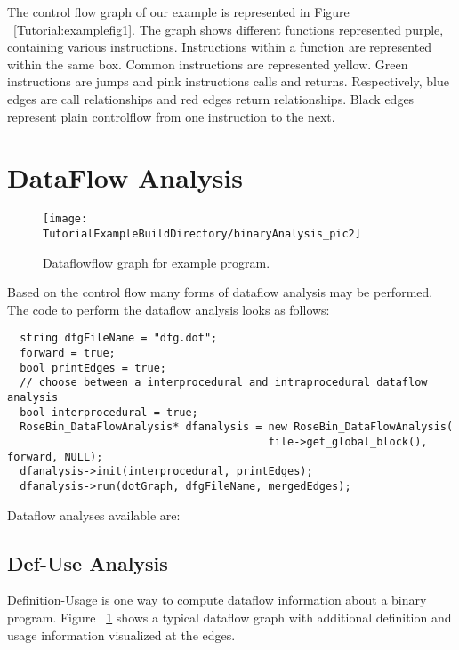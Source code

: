The control flow graph of our example is represented in Figure ~\ref{Tutorial:examplefig1}.
The graph shows different functions represented purple, containing various instructions.
Instructions within a function are represented within the same box. Common instructions are
represented yellow. Green instructions are jumps and pink instructions calls and returns.  
Respectively, blue edges are call relationships and red edges return relationships.
Black edges represent plain controlflow from one instruction to the next.



\section{DataFlow Analysis}

\begin{figure}
\texttt{[image: \\TutorialExampleBuildDirectory/binaryAnalysis\_pic2]}
\caption{Dataflowflow graph for example program.}
\label{Tutorial:examplefig2}
\end{figure}

Based on the control flow many forms of dataflow analysis may be performed.
The code to perform the dataflow analysis looks as follows:

{\mySmallFontSize
\begin{verbatim}
  string dfgFileName = "dfg.dot";
  forward = true;
  bool printEdges = true;
  // choose between a interprocedural and intraprocedural dataflow analysis
  bool interprocedural = true;
  RoseBin_DataFlowAnalysis* dfanalysis = new RoseBin_DataFlowAnalysis(
                                         file->get_global_block(), forward, NULL);
  dfanalysis->init(interprocedural, printEdges);
  dfanalysis->run(dotGraph, dfgFileName, mergedEdges);
\end{verbatim}
}

Dataflow analyses available are:
 
\subsection{Def-Use Analysis}

Definition-Usage is one way to compute dataflow information about a binary program.
Figure ~\ref{Tutorial:examplefig2} shows a typical dataflow graph with additional 
definition and usage information visualized at the edges.

